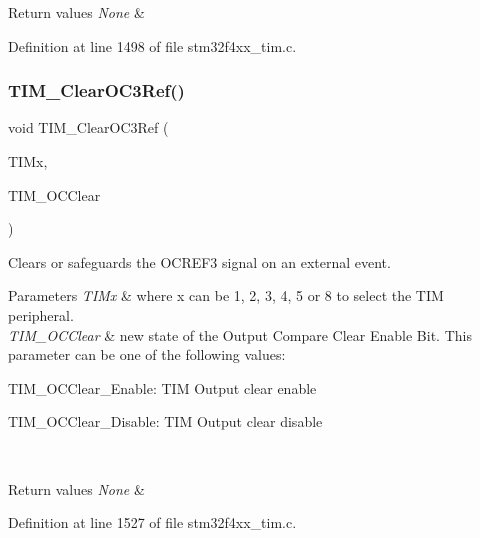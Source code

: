 \begin{DoxyRetVals}{Return values}
{\em None} & \\
\hline
\end{DoxyRetVals}


Definition at line 1498 of file stm32f4xx\+\_\+tim.\+c.

\mbox{\label{group___t_i_m_ga0bd9476a14bd346c319945ec4fa2bc67}} 
\subsubsection{\texorpdfstring{T\+I\+M\+\_\+\+Clear\+O\+C3\+Ref()}{TIM\_ClearOC3Ref()}}
{\footnotesize\ttfamily void T\+I\+M\+\_\+\+Clear\+O\+C3\+Ref (\begin{DoxyParamCaption}\item[{\hyperlink{struct_t_i_m___type_def}{T\+I\+M\+\_\+\+Type\+Def} $\ast$}]{T\+I\+Mx,  }\item[{uint16\+\_\+t}]{T\+I\+M\+\_\+\+O\+C\+Clear }\end{DoxyParamCaption})}



Clears or safeguards the O\+C\+R\+E\+F3 signal on an external event. 


\begin{DoxyParams}{Parameters}
{\em T\+I\+Mx} & where x can be 1, 2, 3, 4, 5 or 8 to select the T\+IM peripheral. \\
\hline
{\em T\+I\+M\+\_\+\+O\+C\+Clear} & new state of the Output Compare Clear Enable Bit. This parameter can be one of the following values\+: \begin{DoxyItemize}
\item T\+I\+M\+\_\+\+O\+C\+Clear\+\_\+\+Enable\+: T\+IM Output clear enable \item T\+I\+M\+\_\+\+O\+C\+Clear\+\_\+\+Disable\+: T\+IM Output clear disable \end{DoxyItemize}
\\
\hline
\end{DoxyParams}

\begin{DoxyRetVals}{Return values}
{\em None} & \\
\hline
\end{DoxyRetVals}


Definition at line 1527 of file stm32f4xx\+\_\+tim.\+c.

